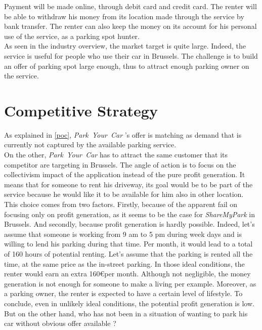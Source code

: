 \documentclass[12pt,a4paper,oneside]{book}
\newcommand{\bp}{\textit{Park~Your~Car }}
\begin{document}
Payment will be made online, through debit card and credit card. The renter will be able to withdraw his money from its location made through the service by bank transfer. The renter can also keep the money on its account for his personal use of the service, as a parking spot hunter.\\

As seen in the industry overview, the market target is quite large. Indeed, the service is useful for people who use their car in Brussels. The challenge is to build an offer of parking spot large enough, thus to attract enough parking owner on the service.

\section{Competitive Strategy}
As explained in \autoref{poc}, \bp's offer is matching as demand that is currently not captured by the available parking service.\\

On the other, \bp has to attract the same customer that its competitor are targeting in Brussels. The angle of action is to focus on the collectivism impact of the application instead of the pure profit generation. It means that for someone to rent his driveway, its goal would be to be part of the service because he would like it to be available for him also in other location.\\
This choice comes from two factors. Firstly, because of the apparent fail on focusing only on profit generation, as it seems to be the case for \textit{ShareMyPark} in Brussels. And secondly, because profit generation is hardly possible. Indeed, let's assume that someone is working from 9 am to 5 pm during week days and is willing to lend his parking during that time. Per month, it would lead to a total of 160 hours of potential renting. Let's assume that the parking is rented all the time, at the same price as the in-street parking. In those ideal conditions, the renter would earn an extra 160\euro  per month. Although not negligible, the money generation is not enough for someone to make a living per example. Moreover, as a parking owner, the renter is expected to have a certain level of lifestyle. To conclude, even in unlikely ideal conditions, the potential profit generation is low. But on the other hand, who has not been in a situation of wanting to park his car without obvious offer available ?\\
\end{document}
